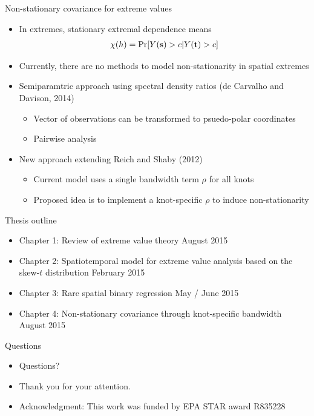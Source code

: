 \documentclass{beamer}
\begin{document}
\begin{frame}{Non-stationary covariance for extreme values}
  \begin{itemize} \setlength{\itemsep}{1em}
    \item In extremes, stationary extremal dependence means
    \begin{align*}
      \chi(h) = \Pr[Y(\mbox{\bf s}) > c | Y(\mbox{\bf t}) > c]
    \end{align*}
    \item Currently, there are no methods to model non-stationarity in spatial extremes
    \item Semiparamtric approach using spectral density ratios (de Carvalho and Davison, 2014)
    \begin{itemize}
      \item Vector of observations can be transformed to psuedo-polar coordinates
      \item Pairwise analysis
    \end{itemize}
    \item New approach extending Reich and Shaby (2012)
    \begin{itemize}
      \item Current model uses a single bandwidth term $\rho$ for all knots
      \item Proposed idea is to implement a knot-specific $\rho$ to induce non-stationarity
    \end{itemize}
  \end{itemize}
\end{frame}


\begin{frame}{Thesis outline}
  \begin{itemize} \setlength{\itemsep}{1em}
    \item Chapter 1: Review of extreme value theory \alert{August 2015}
    \item Chapter 2: Spatiotemporal model for extreme value analysis based on the skew-$t$ distribution \alert{February 2015}
    \item Chapter 3: Rare spatial binary regression \alert{May / June 2015}
    \item Chapter 4: Non-stationary covariance through knot-specific bandwidth \alert{August 2015}
  \end{itemize}
\end{frame}

\begin{frame}{Questions}
  \begin{itemize} \setlength{\itemsep}{1em}
    \item Questions?
    \item Thank you for your attention.
    \item Acknowledgment: This work was funded by EPA STAR award R835228
  \end{itemize}
\end{frame}
\end{document}
